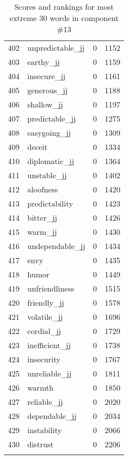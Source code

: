 \begin{longtable}[!htbp]{| rlr@{.}l |}
    402 & unpredictable\_jj & 0 & 1152 \\
    403 & earthy\_jj & 0 & 1159 \\
    404 & insecure\_jj & 0 & 1161 \\
    405 & generous\_jj & 0 & 1188 \\
    406 & shallow\_jj & 0 & 1197 \\
    407 & predictable\_jj & 0 & 1275 \\
    408 & easygoing\_jj & 0 & 1309 \\
    409 & deceit & 0 & 1334 \\
    410 & diplomatic\_jj & 0 & 1364 \\
    411 & unstable\_jj & 0 & 1402 \\
    412 & aloofness & 0 & 1420 \\
    413 & predictability & 0 & 1423 \\
    414 & bitter\_jj & 0 & 1426 \\
    415 & warm\_jj & 0 & 1430 \\
    416 & undependable\_jj & 0 & 1434 \\
    417 & envy & 0 & 1435 \\
    418 & humor & 0 & 1449 \\
    419 & unfriendliness & 0 & 1515 \\
    420 & friendly\_jj & 0 & 1578 \\
    421 & volatile\_jj & 0 & 1696 \\
    422 & cordial\_jj & 0 & 1729 \\
    423 & inefficient\_jj & 0 & 1738 \\
    424 & insecurity & 0 & 1767 \\
    425 & unreliable\_jj & 0 & 1811 \\
    426 & warmth & 0 & 1850 \\
    427 & reliable\_jj & 0 & 2020 \\
    428 & dependable\_jj & 0 & 2034 \\
    429 & instability & 0 & 2066 \\
    430 & distrust & 0 & 2206 \\
    \hline
    \caption{Scores and rankings for most extreme 30 words in component \#13} \\
\end{longtable}
